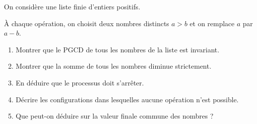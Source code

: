 On considère une liste finie d'entiers positifs.

À chaque opération, on choisit deux nombres distincts $a > b$ et on remplace
$a$ par $a - b$.
\begin{enumerate}
  \item Montrer que le PGCD de tous les nombres de la liste est invariant.
  \item Montrer que la somme de tous les nombres diminue strictement.
  \item En déduire que le processus doit s'arrêter.
  \item Décrire les configurations dans lesquelles aucune opération n'est
  possible.
  \item Que peut-on déduire sur la valeur finale commune des nombres ?
\end{enumerate}

